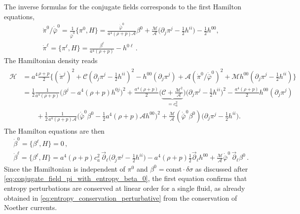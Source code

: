 The inverse formulas for the conjugate fields corresponds to the first Hamilton equations,
{\small\begin{subequations}\label{eq:inverted_conjugate_fields}
\begin{align}
    &\dot{\pi}^0/\dot{\bar{\varphi}}^0=\frac{1}{\dot{\bar{\varphi}}^0}\{\pi^0, H\}=\frac{\dot{\bar{\varphi}}^0}{a^4(\rho+p)\mathcal{A}}\beta^0 + \frac{\mathcal{M}}{\mathcal{A}}\big(\partial_j \pi^j-\tfrac12 h^{ii}\big)-\tfrac12 h^{00}, \label{eq:inverted_conjugate_fields_entropy}\\[2.5pt]
    &\dot{\pi}^\ell=\{\pi^\ell, H\}=\frac{\beta^\ell}{a^4(\rho+p)}-h^{0\ell}\,. \label{eq:inverted_conjugate_fields_velocity}
\end{align}
\end{subequations}}
The Hamiltonian density reads
{\small\begin{align}\label{eq:hamiltonian_phonons}
\begin{aligned}
    \mathcal{H}&= a^4\frac{\rho+p}{2}\bigg\{
    (\dot{\pi}^j)^2 +\mathcal{C}(\partial_j \pi^j-\tfrac12 h^{ii})^2 -h^{00} (\partial_j\pi^j)
     + \mathcal{A} (\dot{\pi}^0/\dot{\bar{\varphi}}^0)^2 +\mathcal{M}h^{00} (\partial_j \pi^j-\tfrac12 h^{ii}) \bigg\}\\[3pt]
     &= \tfrac12 \tfrac{1}{a^4(\rho+p)}\big(\beta^j-a^4(\rho+p)h^{0j}\big)^2 +\tfrac{a^4(\rho+p)}{2}\big(\underbrace{\mathcal{C}+\tfrac{\mathcal{M}^2}{\mathcal{A}}}_{=c_a^2}\big)\big(\partial_j\pi^j-\tfrac12 h^{ii}\big)^2 - \tfrac{a^4(\rho+p)}{2} h^{00} (\partial_j\pi^j)\\[1pt]
     &\qquad+\tfrac12 \tfrac{1}{a^4(\rho+p)\mathcal{A}}\Big(\dot{\bar{\varphi}}^0\beta^0-\tfrac12 a^4(\rho+p)\mathcal{A}h^{00}\Big)^2 + \tfrac{\mathcal{M}}{\mathcal{A}} (\dot{\bar{\varphi}}^0\beta^0)\big(\partial_j\pi^j-\tfrac12 h^{ii}\big).
\end{aligned}\end{align}}
The Hamilton equations are then
{\small\begin{subequations}\label{eq:hamiltonian_equations}
\begin{align}
    &\dot{\beta}^0= \{\beta^\ell, H\} = 0\,, \label{eq:hamilton_eq_entropy}\\[2.5pt]
    &\dot{\beta}^\ell = \{\beta^\ell, H\} = a^4(\rho+p) c_a^2\,\vec{\partial}_\ell\big(\partial_j\pi^j-\tfrac12 h^{ii}\big) - a^4(\rho+p)\tfrac12 \vec{\partial}_\ell h^{00}+ \tfrac{\mathcal{M}}{\mathcal{A}} \dot{\bar{\varphi}}^0\, \vec{\partial}_\ell\beta^0\,.\label{eq:hamilton_eq_euler_velocity}
\end{align}\end{subequations}}
Since the Hamiltonian is independent of $\pi^0$ and $\beta^0 = \text{const}\cdot  \delta\sigma$ as discussed after \eqref{eq:conjugate_field_pi_with_entropy_beta_0}, the first equation confirms that entropy perturbations are conserved at linear order for a single fluid, as already obtained in \eqref{eq:entropy_conservation_perturbative} from the conservation of  Noether currents.

